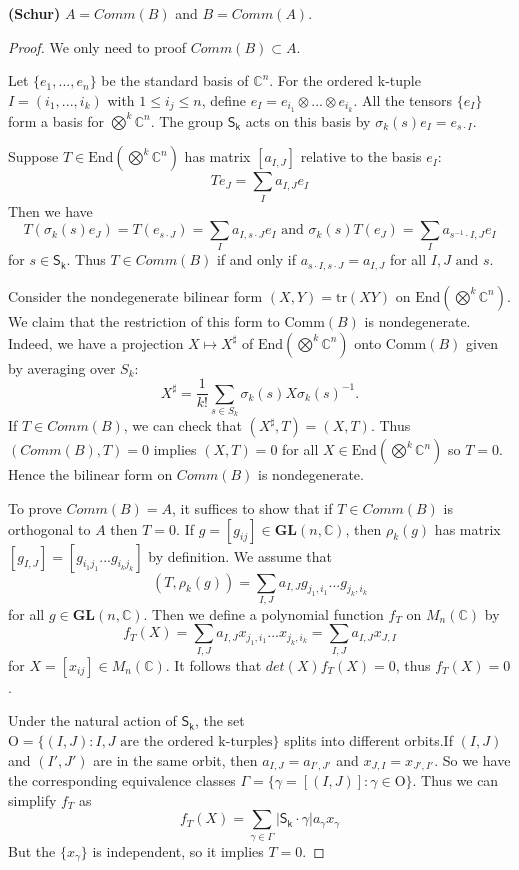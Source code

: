 \documentclass[12pt]{article}
\newcommand{\C}{\mathbb{C}}
\newenvironment{theorem}[2][Theorem]{\begin{trivlist}
\item[\hskip \labelsep {\bfseries #1}\hskip \labelsep {\bfseries #2.}]}{\end{trivlist}}
\begin{document}
\begin{theorem}{8.1}
    \textbf{(Schur)} $A=Comm(B)$ and $B=Comm(A)$.
\end{theorem}
\begin{proof}
    We only need to proof $Comm(B)\subset A$.

    Let $\{e_1,...,e_n\}$ be the standard basis of $\C^n$. For the ordered k-tuple $I=(i_1,...,i_k)$ with $1\le i_j\le n$, define $e_I=e_{i_1}\otimes...\otimes e_{i_k}$. All the tensors $\{e_I\}$ form a basis for $\bigotimes^k \C^n$. The group $\mathsf{S_k}$ acts on this basis by $\sigma_k(s)e_I=e_{s\cdot I}$.

    Suppose $T\in \mathrm{End}(\bigotimes^k \C^n)$ has matrix $[a_{I,J}]$ relative to the basis ${e_I}$:
    $$
    Te_J=\sum_Ia_{I,J}e_I
    $$
    Then we have 
    $$
    T(\sigma_k(s)e_J)=T(e_{s\cdot J})=\sum_Ia_{I,s\cdot J}e_I\text{ and } \sigma_k(s)T(e_J)=\sum_Ia_{s^{-1}\cdot I,J}e_I
    $$
    for $s\in \mathsf{S_k}$. Thus $T\in Comm(B)$ if and only if $a_{s\cdot I,s\cdot J}=a_{I,J}$ for all $I,J\text{ and }s$. 

    Consider the nondegenerate bilinear form $(X, Y) = \mathrm{tr}(XY)$ on $\mathrm{End}\left(\bigotimes^k \mathbb{C}^n\right)$. We claim that the restriction of this form to $\mathrm{Comm}(B)$ is nondegenerate. Indeed, we have a projection $X \mapsto X^\sharp$ of $\mathrm{End}\left(\bigotimes^k \mathbb{C}^n\right)$ onto $\mathrm{Comm}(B)$ given by averaging over $S_k$:
    $$
    X^\sharp = \frac{1}{k!} \sum_{s \in S_k} \sigma_k(s) X \sigma_k(s)^{-1}.
    $$
    If $T\in Comm(B)$, we can check that $(X^{\sharp},T) = (X,T)$. Thus $(Comm(B), T)=0$ implies $(X,T)=0$ for all $X\in \mathrm{End}(\bigotimes^k\C^n)$ so $T=0$. Hence the bilinear form on $Comm(B)$ is nondegenerate.

    To prove $Comm(B) =A$, it suffices to show that if $T\in Comm(B)$ is orthogonal to $A$ then $T = 0$. If $g=[g_{ij}]\in \mathbf{GL}(n,\C)$, then $\rho_k(g)$ has matrix $[g_{I,J}]=[g_{i_1j_1}...g_{i_kj_k}]$ by definition. We assume that
    $$
    (T,\rho_k(g))=\sum_{I,J}a_{I,J}g_{j_1,i_1}...g_{j_k,i_k}
    $$
    for all $g\in \mathbf{GL}(n,\C)$. Then we define a polynomial function $f_T$ on $M_n(\C)$ by 
    $$
    f_T(X)= \sum_{I,J}a_{I,J}x_{j_1,i_1}...x_{j_k,i_k}=\sum_{I,J}a_{I,J}x_{J,I}
    $$
    for $X=[x_{ij}]\in M_n(\C)$. It follows that $det(X)f_T(X)= 0$, thus $f_T(X)=0$.

    Under the natural action of $\mathsf{S_k}$, the set $\mathrm{O}= \{(I,J):I,J \text{ are the ordered k-turples}\}$ splits into different orbits.If $(I,J)$ and $(I',J')$ are in the same orbit, then $a_{I,J}=a_{I',J'}$ and $x_{J,I}=x_{J',I'}$. So we have the corresponding equivalence classes $\Gamma=\{\gamma=[(I,J)]:\gamma \in \mathrm{O}\}$. Thus we can simplify $f_T$ as
    $$
    f_T(X)= \sum_{\gamma \in \Gamma}|\mathsf{S_k \cdot \gamma}|a_{\gamma}x_{\gamma}
    $$
    But the $\{x_{\gamma}\}$ is independent, so it implies $T=0$.


\end{proof}
\end{document}
